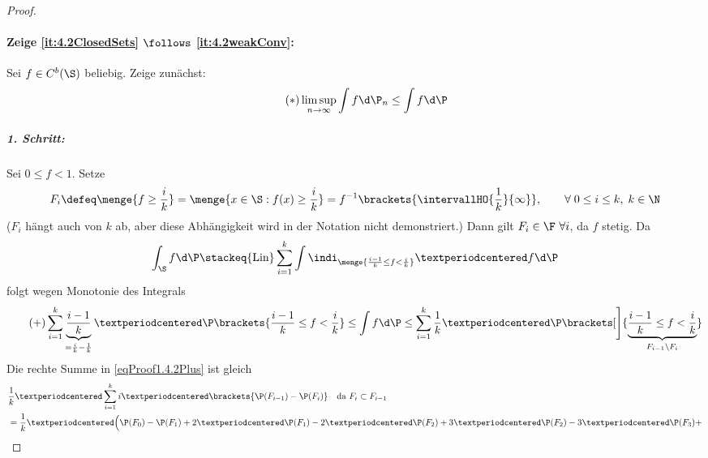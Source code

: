 \begin{proof}
	\paragraph{Zeige \ref{it:4.2ClosedSets} $\follows$ \ref{it:4.2weakConv}:}
	Sei $f\in C^b(\S)$ beliebig. Zeige zunächst:
	\begin{align}\label{eqProof1.4.2Sternchen}\tag{$\ast$}
		\limsup_{n\to\infty}\int f\d \P_n\le\int f\d \P
	\end{align}
	\subparagraph{1. Schritt:} Sei $0\le f<1$. Setze
	\begin{align*}
		F_i\defeq\menge{ f\ge\frac{i}{k}}=\menge{ x\in\S:f(x)\ge\frac{i}{k}}
		= f^{-1}\brackets{\intervallHO{\frac1k}{\infty}},\qquad \forall\; 0\le i\le k,\;k\in\N
	\end{align*}
	($F_i$ hängt auch von $k$ ab, aber diese Abhängigkeit wird in der Notation nicht
	demonstriert.)
	Dann gilt $F_i\in\F~\forall i$, da $f$ stetig. Da
	\begin{align*}
		\int_{\S}f\d \P
		\stackeq{\text{Lin}}
		\sum_{i=1}^k\int\indi_{\menge{\frac{i-1}{k}\le f<\frac{i}{k}}}· f\d \P
	\end{align*}
	folgt wegen Monotonie des Integrals
	\begin{align}\label{eqProof1.4.2Plus}\tag{+}
		\sum_{i=1}^k\underbrace{\frac{i-1}{k}}_{=\frac{i}{k}-\frac{1}{k}}·
	\P\brackets{\frac{i-1}{k}\le f<\frac{i}{k}}
		\le
		\int f\d \P
		\le
		\sum_{i=1}^k \frac{1}{k}· \P\brackets[\Bigg]{\underbrace{\frac{i-1}{k}\le f<\frac{i}{k}}_{F_{i-1}\setminus F_i}}
	\end{align}
	Die rechte Summe in \eqref{eqProof1.4.2Plus} ist gleich
	\begin{align*}
		&\frac{1}{k}·\sum_{i=1}^k i·\brackets{ \P(F_{i-1})-\P(F_i)}
		\quad \text{da $F_i \subset F_{i-1}$}\\
		&=\frac{1}{k}·\Big(\P(F_0)-\P(F_1)+2· \P(F_1)-2· \P(F_2)+3· \P(F_2)-3· \P(F_3)+\\


\end{align*}
\end{proof}
